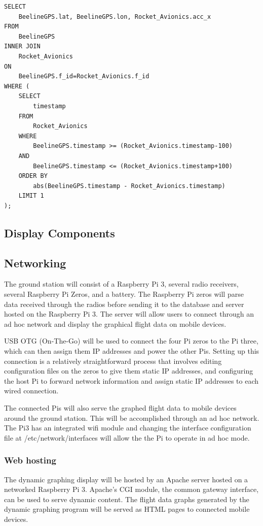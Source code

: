 \documentclass[onecolumn, draftclsnofoot, 10pt, compsoc]{IEEEtran}
\begin{document}
\begin{lstlisting}[frame=single]
SELECT
	BeelineGPS.lat, BeelineGPS.lon, Rocket_Avionics.acc_x
FROM
	BeelineGPS
INNER JOIN
	Rocket_Avionics
ON
	BeelineGPS.f_id=Rocket_Avionics.f_id
WHERE (
	SELECT
		timestamp
	FROM
		Rocket_Avionics
	WHERE
		BeelineGPS.timestamp >= (Rocket_Avionics.timestamp-100)
	AND
		BeelineGPS.timestamp <= (Rocket_Avionics.timestamp+100)
	ORDER BY
		abs(BeelineGPS.timestamp - Rocket_Avionics.timestamp)
	LIMIT 1
);
\end{lstlisting}

\subsection{Display Components}

\subsection{Networking}

The ground station will consist of a Raspberry Pi 3, several radio receivers, several Raspberry Pi Zeros, and a battery. 
The Raspberry Pi zeros will parse data received through the radios before sending it to the database and server hosted on the Raspberry  Pi 3. 
The server will allow users to connect through an ad hoc network and display the graphical flight data on mobile devices. 

USB OTG (On-The-Go) will be used to connect the four Pi zeros to the Pi three, which can then assign them IP addresses and power the other Pis. 
Setting up this connection is a relatively straightforward process that involves editing configuration files on the zeros to give them static IP addresses, and configuring the host Pi to forward network information and assign static IP addresses to each wired connection. \cite{OTG}

The connected Pis will also serve the graphed flight data to mobile devices around the ground station.
This will be accomplished through an ad hoc network. 
The Pi3 has an integrated wifi module and changing the interface configuration file at /etc/network/interfaces will allow the the Pi to operate in ad hoc mode. \cite{config-adhoc}

\subsubsection{Web hosting}

The dynamic graphing display will be hosted by an Apache server hosted on a networked Raspberry Pi 3. 
Apache's CGI module, the common gateway interface, can be used to serve dynamic content.\cite{apache}
The flight data graphs generated by the dynamic graphing program will be served as HTML pages to connected mobile devices.
\end{document}

